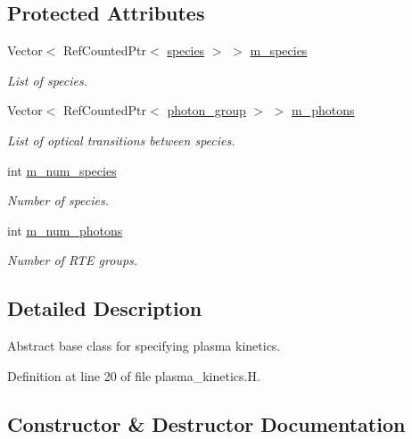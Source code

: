 \subsection*{Protected Attributes}
\begin{DoxyCompactItemize}
\item 
Vector$<$ Ref\+Counted\+Ptr$<$ \hyperlink{classspecies}{species} $>$ $>$ \hyperlink{classplasma__kinetics_a25a67ec0e29bd259a597f3e998dffd75}{m\+\_\+species}
\begin{DoxyCompactList}\small\item\em List of species. \end{DoxyCompactList}\item 
Vector$<$ Ref\+Counted\+Ptr$<$ \hyperlink{classphoton__group}{photon\+\_\+group} $>$ $>$ \hyperlink{classplasma__kinetics_a9057951a593f4f1450704293fd7fb000}{m\+\_\+photons}
\begin{DoxyCompactList}\small\item\em List of optical transitions between species. \end{DoxyCompactList}\item 
int \hyperlink{classplasma__kinetics_a105cd67bd64d10cd18ce6502760a4d7f}{m\+\_\+num\+\_\+species}
\begin{DoxyCompactList}\small\item\em Number of species. \end{DoxyCompactList}\item 
int \hyperlink{classplasma__kinetics_aa26fec6f150ceec849a011038060641e}{m\+\_\+num\+\_\+photons}
\begin{DoxyCompactList}\small\item\em Number of R\+TE groups. \end{DoxyCompactList}\end{DoxyCompactItemize}


\subsection{Detailed Description}
Abstract base class for specifying plasma kinetics. 

Definition at line 20 of file plasma\+\_\+kinetics.\+H.



\subsection{Constructor \& Destructor Documentation}
